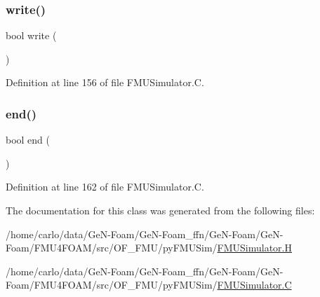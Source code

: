 \subsubsection{\texorpdfstring{write()}{write()}}
{\footnotesize\ttfamily bool write (\begin{DoxyParamCaption}{ }\end{DoxyParamCaption})\hspace{0.3cm}{\ttfamily [virtual]}}



Definition at line 156 of file F\+M\+U\+Simulator.\+C.

\mbox{\label{classFoam_1_1functionObjects_1_1FMUSimulator_af545ab12986d2fe462f1013c3bafb5f3}} 
\subsubsection{\texorpdfstring{end()}{end()}}
{\footnotesize\ttfamily bool end (\begin{DoxyParamCaption}{ }\end{DoxyParamCaption})\hspace{0.3cm}{\ttfamily [virtual]}}



Definition at line 162 of file F\+M\+U\+Simulator.\+C.



The documentation for this class was generated from the following files\+:\begin{DoxyCompactItemize}
\item 
/home/carlo/data/\+Ge\+N-\/\+Foam/\+Ge\+N-\/\+Foam\+\_\+ffn/\+Ge\+N-\/\+Foam/\+Ge\+N-\/\+Foam/\+F\+M\+U4\+F\+O\+A\+M/src/\+O\+F\+\_\+\+F\+M\+U/py\+F\+M\+U\+Sim/\hyperlink{FMUSimulator_8H}{F\+M\+U\+Simulator.\+H}\item 
/home/carlo/data/\+Ge\+N-\/\+Foam/\+Ge\+N-\/\+Foam\+\_\+ffn/\+Ge\+N-\/\+Foam/\+Ge\+N-\/\+Foam/\+F\+M\+U4\+F\+O\+A\+M/src/\+O\+F\+\_\+\+F\+M\+U/py\+F\+M\+U\+Sim/\hyperlink{FMUSimulator_8C}{F\+M\+U\+Simulator.\+C}\end{DoxyCompactItemize}
